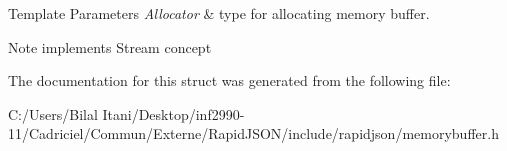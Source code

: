 \begin{DoxyTemplParams}{Template Parameters}
{\em Allocator} & type for allocating memory buffer. \\
\hline
\end{DoxyTemplParams}
\begin{DoxyNote}{Note}
implements Stream concept 
\end{DoxyNote}


The documentation for this struct was generated from the following file\+:\begin{DoxyCompactItemize}
\item 
C\+:/\+Users/\+Bilal Itani/\+Desktop/inf2990-\/11/\+Cadriciel/\+Commun/\+Externe/\+Rapid\+J\+S\+O\+N/include/rapidjson/memorybuffer.\+h\end{DoxyCompactItemize}
